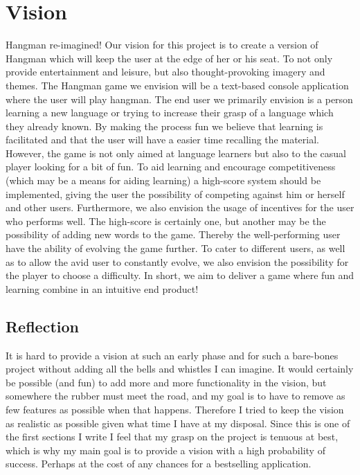 \documentclass[12pt, letterpaper]{article}
\begin{document}
\section{Vision}
Hangman re-imagined! Our vision for this project is to create a version of Hangman which will keep the user at the edge of her or his seat. To not only provide entertainment and leisure, but also thought-provoking imagery and themes. 
\newline
\newline
 The Hangman game we envision will be a text-based console application where the user will play hangman. The end user we primarily envision is a person learning a new language or trying to increase their grasp of a language which they already known. By making the process fun we believe that learning is facilitated and that the user will have a easier time recalling the material. However, the game is not only aimed at language learners but also to the casual player looking for a bit of fun.
 \newline
 \newline
 To aid learning and encourage competitiveness (which may be a means for aiding learning) a high-score system should be implemented, giving the user the possibility of competing against him or herself and other users. Furthermore, we also envision the usage of incentives for the user who performs well. The high-score is certainly one, but another may be the possibility of adding new words to the game. Thereby the well-performing user have the ability of evolving the game further. To cater to different users, as well as to allow the avid user to constantly evolve, we also envision the possibility for the player to choose a difficulty.
 \newline
 \newline
  In short, we aim to deliver a game where fun and learning combine in an intuitive end product!
  \subsection{Reflection}
  It is hard to provide a vision at such an early phase and for such a bare-bones project without adding all the bells and whistles I can imagine. It would certainly be possible (and fun) to add more and more functionality in the vision, but somewhere the rubber must meet the road, and my goal is to have to remove as few features as possible when that happens. Therefore I tried to keep the vision as realistic as possible given what time I have at my disposal. Since this is one of the first sections I write I feel that my grasp on the project is tenuous at best, which is why my main goal is to provide a vision with a high probability of success. Perhaps at the cost of any chances for a bestselling application.  
\end{document}
